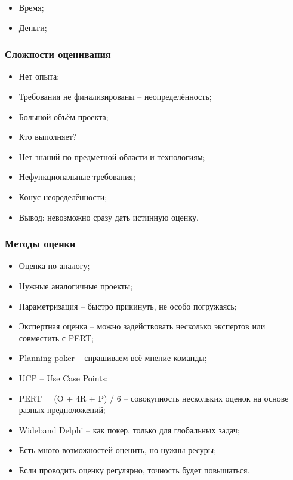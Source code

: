 \documentclass[a4paper,8pt]{article}
\begin{document}
    \begin{itemize}
        \item Время;
        \item Деньги;
    \end{itemize}

    \subsubsection{Сложности оценивания}

        \begin{itemize}
            \item Нет опыта;
            \item Требования не финализированы -- неопределённость;
            \item Большой объём проекта;
            \item Кто выполняет?
            \item Нет знаний по предметной области и технологиям;
            \item Нефункциональные требования;
            \item Конус неоределённости;
            \item Вывод: невозможно сразу дать истинную оценку.
        \end{itemize}


    \subsubsection{Методы оценки}


        \begin{itemize}
            \item Оценка по аналогу;
            \item Нужные аналогичные проекты;
            \item Параметризация -- быстро прикинуть, не особо погружаясь;
            \item Экспертная оценка -- можно задействовать несколько экспертов или совместить с PERT;
            \item Planning poker -- спрашиваем всё мнение команды;
            \item UCP -- Use Case Points;
            \item PERT = (O + 4R + P) / 6 -- совокупность нескольких оценок на основе разных предположений;
            \item Wideband Delphi -- как покер, только для глобальных задач;
            \item Есть много возможностей оценить, но нужны ресуры;
            \item Если проводить оценку регулярно, точность будет повышаться.
        \end{itemize}
\end{document}
